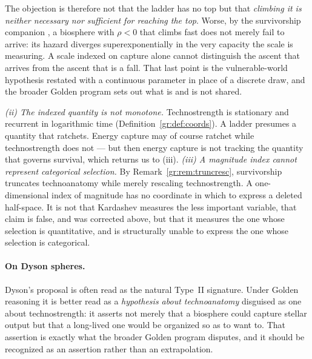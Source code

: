 \documentclass[11pt]{article}
\theoremstyle{plain}
\theoremstyle{definition}
\theoremstyle{remark}
\begin{document}
The objection is therefore not that the ladder has no top but that
\emph{climbing it is neither necessary nor sufficient for reaching the
top}. Worse, by the survivorship companion \cite{SurvA}, a biosphere with
$\rho<0$ that climbs fast does not merely fail to arrive: its hazard
diverges superexponentially in the very capacity the scale is
measuring. A scale indexed on capture alone cannot distinguish the
ascent that arrives from the ascent that is a fall. That last point is
the vulnerable-world hypothesis \cite{Bostrom19} restated with a
continuous parameter in place of a discrete draw, and
the broader Golden program sets out what is and is not shared.

\emph{(ii) The indexed quantity is not monotone.} Technostrength is
stationary and recurrent in logarithmic time
(Definition~\ref{gr:def:coords}). A ladder presumes a quantity that
ratchets. Energy capture may of course ratchet while technostrength does
not --- but then energy capture is not tracking the quantity that
governs survival, which returns us to (iii). \emph{(iii) A magnitude index cannot represent categorical selection.}
By Remark~\ref{gr:rem:truncresc}, survivorship truncates technoanatomy
while merely rescaling technostrength. A one-dimensional index of
magnitude has no coordinate in which to express a deleted half-space. It
is not that Kardashev measures the less important variable, that
claim is false, and was corrected above, but that it measures the one
whose selection is quantitative, and is structurally unable to express
the one whose selection is categorical.

\paragraph{On Dyson spheres.}\label{gr:rem:dyson}
Dyson's proposal \cite{Dys60} is often read as the natural
Type~II signature. Under Golden reasoning it is better read as a
\emph{hypothesis about technoanatomy} disguised as one about
technostrength: it asserts not merely that a biosphere could capture
stellar output but that a long-lived one would be organized so as to
want to. That assertion is exactly what the broader Golden program
disputes, and it should be recognized as an assertion rather than an
extrapolation.
\end{document}

